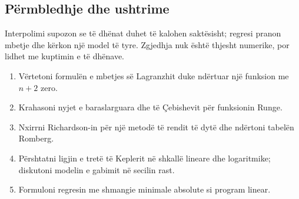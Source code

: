 \subsection{Përmbledhje dhe ushtrime}
Interpolimi supozon se të dhënat duhet të kalohen saktësisht; regresi pranon mbetje dhe kërkon një model të tyre. Zgjedhja nuk është thjesht numerike, por lidhet me kuptimin e të dhënave.
\begin{enumerate}
\item Vërtetoni formulën e mbetjes së Lagranzhit duke ndërtuar një funksion me $n+2$ zero.
\item Krahasoni nyjet e baraslarguara dhe të Çebishevit për funksionin Runge.
\item Nxirrni Richardson-in për një metodë të rendit të dytë dhe ndërtoni tabelën Romberg.
\item Përshtatni ligjin e tretë të Keplerit në shkallë lineare dhe logaritmike; diskutoni modelin e gabimit në secilin rast.
\item Formuloni regresin me shmangie minimale absolute si program linear.
\end{enumerate}
